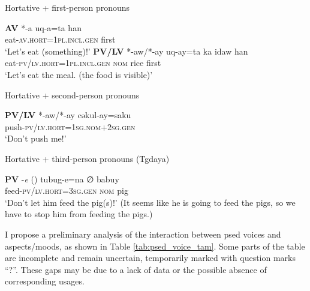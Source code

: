 \begin{exe}
\ex Hortative + first-person pronouns \label{ex:SetIII_1}
    \begin{xlist}
    \ex \textbf{AV} *-a
    \gll *uq-a=ta han\\
    eat-\textsc{av.hort}=\textsc{1pl.incl.gen} first\\
    \glt `Let's eat (something)!'
    \ex \textbf{PV/LV} *-aw/*-ay
    \gll *uq-ay=ta ka idaw han\\
    eat-\textsc{pv/lv.hort}=\textsc{1pl.incl.gen} \textsc{nom} rice first\\
    \glt `Let's eat the meal. (the food is visible)'
    \end{xlist}
\ex Hortative + second-person pronouns \label{ex:SetIII_2}
    \begin{xlist}
    \ex \textbf{PV/LV} *-aw/*-ay
    \gll *cəkul-ay=saku\\
    push-\textsc{pv/lv.hort}=\textsc{1sg.nom+2sg.gen}\\
    \glt `Don't push me!'
    \end{xlist}
\end{exe}


\begin{exe}
\ex Hortative + third-person pronouns (Tgdaya) \label{ex:SetIII_3}
    \begin{xlist}
    \ex \textbf{PV} -\textit{e} (\cite[98]{ochiai2016phd})
    \gll tubug-e=na ∅ babuy\\
    feed-\textsc{pv/lv.hort}=\textsc{3sg.gen} \textsc{nom} pig\\
    \glt `Don't let him feed the pig(s)!' (It seems like he is going to feed the pigs, so we have to stop him from feeding the pigs.)
    \end{xlist}
\end{exe}

I propose a preliminary analysis of the interaction between \acl{psed} voices and aspects/moods, as shown in Table \ref{tab:psed_voice_tam}. Some parts of the table are incomplete and remain uncertain, temporarily marked with question marks ``?''. These gaps may be due to a lack of data or the possible absence of corresponding usages.

